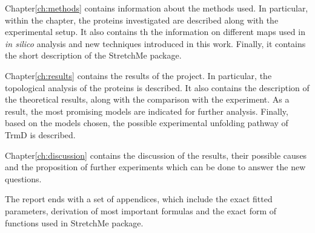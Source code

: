 Chapter\ref{ch:methods} contains information about the methods used.
In particular, within the chapter, the proteins investigated are described along with the experimental setup.
It also contains th the information on different maps used in \textit{in silico} analysis and new techniques introduced in this work.
Finally, it contains the short description of the StretchMe package.

Chapter\ref{ch:results} contains the results of the project.
In particular, the topological analysis of the proteins is described.
It also contains the description of the theoretical results, along with the comparison with the experiment.
As a result, the most promising models are indicated for further analysis.
Finally, based on the models chosen, the possible experimental unfolding pathway of TrmD is described.

Chapter\ref{ch:discussion} contains the discussion of the results, their possible causes and the proposition of further experiments which can be done to answer the new questions.

The report ends with a set of appendices, which include the exact fitted parameters, derivation of most important formulas and the exact form of functions used in StretchMe package.
